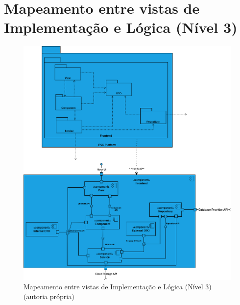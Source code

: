 \chapter{Mapeamento entre vistas de Implementação e Lógica (Nível 3)}
\label{AppendixB}

\begin{figure}[h]
    \centering
    \includegraphics[width=5in]{frontmatter/assets/diagrams/Mapeamento.drawio.png}
    \caption{Mapeamento entre vistas de Implementação e Lógica (Nível 3) (autoria própria)}
    \label{fig:mapeamento}
\end{figure}